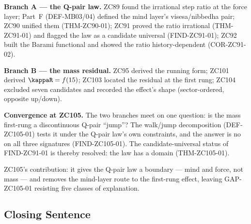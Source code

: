 \documentclass[12pt, a4paper]{article}
\begin{document}
\begin{genealogybox}[title={How ZC105 Bounds the Cross-Layer Law}]
\textbf{Branch A --- the Q-pair law.}
ZC89 found the irrational step ratio at the force layer; Part~F (DEF-MB03/04)
defined the mind layer's visesa/nibbedha pair; ZC90 unified them (THM-ZC90-01);
ZC91 proved the ratio irrational (THM-ZC91-01) and flagged the law as a candidate
universal (FIND-ZC91-01); ZC92 built the Barami functional and showed the ratio
history-dependent (COR-ZC91-02).

\textbf{Branch B --- the mass residual.}
ZC95 derived the running form; ZC101 derived $\kappaR=f(15)$; ZC103 located the
residual at the first rung; ZC104 excluded seven candidates and recorded the
effect's shape (sector-ordered, opposite up/down).

\textbf{Convergence at ZC105.}
The two branches meet on one question: is the mass first-rung a discontinuous
Q-pair ``jump''? The walk/jump decomposition (DEF-ZC105-01) tests it under the
Q-pair law's own constraints, and the answer is no on all three signatures
(FIND-ZC105-01). The candidate-universal status of FIND-ZC91-01 is thereby
resolved: the law has a domain (THM-ZC105-01).

ZC105's contribution: it gives the Q-pair law a boundary --- mind and force, not
mass --- and removes the mind-layer route to the first-rung effect, leaving
GAP-ZC105-01 resisting five classes of explanation.
\end{genealogybox}

\subsection{Closing Sentence}
\end{document}
